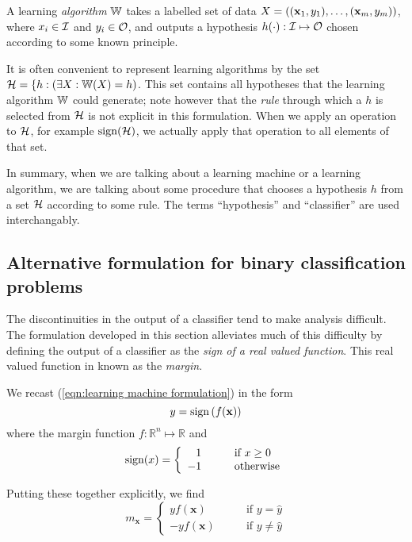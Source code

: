 A learning \emph{algorithm} $\mathbb{W}$ takes a labelled set of data $X =
((\mathbf{x}_1, y_1), \ldots, (\mathbf{x}_m, y_m))$, where $x_i \in \mathcal{I}$ and
$y_i \in \mathcal{O}$, and outputs a hypothesis $h(\cdot) : \mathcal{I} \mapsto
\mathcal{O}$ chosen according to some known principle.

It is often convenient to represent learning algorithms by the set
$\mathcal{H} = \{h : \left( \exists X : \mathbb{W}(X) = h \right)$.  This set
contains all hypotheses that the learning algorithm $\mathbb{W}$ could
generate; note however that the \emph{rule} through which a $h$ is
selected from $\mathcal{H}$ is not explicit in this formulation. 
When we apply an operation to $\mathcal{H}$, for example $\mathrm{sign}(\mathcal{H})$, we
actually apply that operation to all elements of that set.

In summary, when we are talking about a learning machine or a learning
algorithm, we are talking about some procedure that chooses a
hypothesis $h$ from a set $\mathcal{H}$ according to some rule.  The terms
``hypothesis'' and ``classifier'' are used interchangably.


\subsection{Alternative formulation for binary classification problems}
\label{sec:margin formulation}
The discontinuities in the output of a classifier tend to make
analysis difficult.  The formulation developed in this section
alleviates much of this difficulty by defining the output of a
classifier as the  \emph{sign of a real valued function}.  This real
valued function in known as the \emph{margin}.

We recast (\ref{eqn:learning machine formulation}) in the form
%
\begin{equation}
y = \mathrm{sign} \left( f(\mathbf{x}) \right)
\label{eqn:marginal classification formulation}
\end{equation}
%
where the margin function $f : \mathbb{R}^n \mapsto \mathbb{R}$ and
%
\begin{equation}
\mathrm{sign} (x) = \left\{ \begin{array}{rl}
1	& \qquad \mbox{if $x \geq 0$} \\
-1	& \qquad \mbox{otherwise}
\end{array} \right.
\end{equation}
%

Putting these together explicitly, we find
%
\begin{equation}
m_{\mathbf{x}} = \left\{ \begin{array}{rl}
yf(\mathbf{x})	& \qquad \mbox{if $y = \hat{y}$} \\
-yf(\mathbf{x})	& \qquad \mbox{if $y \neq \hat{y}$}
\end{array} \right.
\label{eqn:margin definition}
\end{equation}

